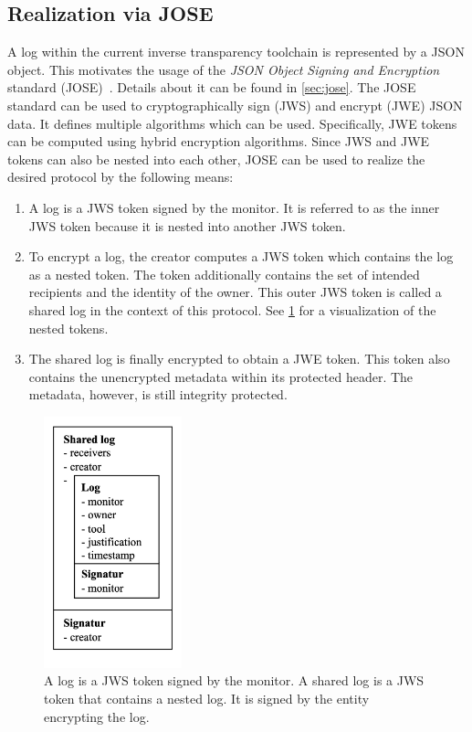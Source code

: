 \documentclass[../main.tex]{subfiles}
\begin{document}
\subsection{Realization via JOSE}
\label{sec:jose-protocol}

A log within the current inverse transparency toolchain is represented by a JSON object.
This motivates the usage of the \emph{JSON Object Signing and Encryption} standard (JOSE)~\cite{Barnes2014}.
Details about it can be found in \cref{sec:jose}.
The JOSE standard can be used to cryptographically sign (JWS) and encrypt (JWE) JSON data.
It defines multiple algorithms which can be used.
Specifically, JWE tokens can be computed using hybrid encryption algorithms.
Since JWS and JWE tokens can also be nested into each other, JOSE can be used to realize the desired protocol by the following means:
\begin{enumerate}
    \item 
    A log is a JWS token signed by the monitor.
    It is referred to as the inner JWS token because it is nested into another JWS token.
    \item 
    To encrypt a log, the creator computes a JWS token which contains the log as a nested token.
    The token additionally contains the set of intended recipients and the identity of the owner.
    This outer JWS token is called a shared log in the context of this protocol.
    See \cref{fig:nested-jws} for a visualization of the nested tokens.
    \item
    The shared log is finally encrypted to obtain a JWE token.
    This token also contains the unencrypted metadata within its protected header.
    The metadata, however, is still integrity protected.
\end{enumerate}


\begin{figure}[h!]
    \includegraphics[width=4cm]{../img/05/nested_jws.jpg}
    \centering
    \caption[Nested JWS tokens]{A log is a JWS token signed by the monitor. A shared log is a JWS token that contains a nested log. It is signed by the entity encrypting the log.}
    \label{fig:nested-jws}
\end{figure}
\end{document}
